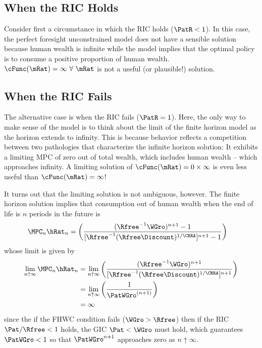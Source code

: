 \subsection{When the RIC Holds}
Consider first a circumstance in which the RIC holds ($\PatR<1$).  In this case, the perfect foresight unconstrained model does not have a sensible solution because human wealth is infinite while the model implies that the optimal policy is to consume a positive proportion of human wealth.  $\cFunc(\mRat)=\infty~\forall~\mRat$ is not a useful (or plausible!) solution.

\subsection{When the RIC Fails}
The alternative case is when the RIC fails ($\PatR=1$).  Here, the only way to make sense of the model is to think about the limit of the finite horizon model as the horizon extends to infinity.  This is because behavior reflects a competition between two pathologies that characterize the infinite horizon solution:  It exhibits a limiting MPC of zero out of total wealth, which includes human wealth -- which approaches infinity.  A limiting solution of $\cFunc(\mRat) = 0 \times \infty$ is even less useful than $\cFunc(\mRat) = \infty$!

It turns out that the limiting solution is not ambiguous, however.  The finite horizon solution implies that consumption out of human wealth when the end of life is $n$ periods in the future is
\begin{equation}\begin{gathered}\begin{aligned}
  \MPC_{n} \hRat_{n} & =  \left(\frac{(\Rfree^{-1}{\WGro})^{{n}+1}-1}{[\Rfree^{-1}(\Rfree\Discount)^{1/\CRRA}]^{{n}+1}-1}\right)
\end{aligned}\end{gathered}\end{equation}
whose limit is given by
\begin{equation}\begin{gathered}\begin{aligned}
\lim_{{n} \uparrow \infty} \MPC_{n} \hRat_{n} & =  \lim_{n \uparrow \infty} \left(\frac{(\Rfree^{-1}{\WGro})^{{n}+1}}{[\Rfree^{-1}(\Rfree\Discount)^{1/\CRRA}]^{{n}+1}}\right)
\\ & =  \lim_{n \uparrow \infty} \left(\frac{1}{\PatWGro^{(n+1)}}\right)
\\ & =  \infty
\end{aligned}\end{gathered}\end{equation}
since the if the FHWC condition fails ($\WGro > \Rfree$) then if the RIC $\Pat/\Rfree < 1$ holds, the GIC $\Pat < \WGro$ must hold, which guarantees $\PatWGro < 1$ so that $\PatWGro^{n+1}$ approaches zero as $n \uparrow \infty.$

